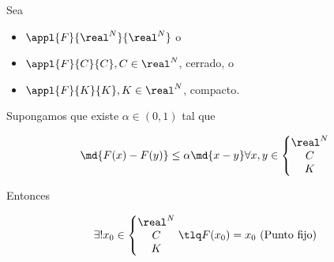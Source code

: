 \begin{theorem} Sea 
\begin{itemize}
\item $\appl{F}{\real^N}{\real^N}$ o
\item $\appl{F}{C}{C}, C\in \real^N$, cerrado, o
\item $\appl{F}{K}{K}, K\in \real^N$, compacto.
\end{itemize}

Supongamos que existe $\alpha\in(0,1)$ tal que

\[ \md{F(x)-F(y)}\leq \alpha\md{x-y} \forall x,y \in \left\{\begin{matrix}
                                                           \real^N\\
                                                           C\\
                                                           K
                                                          \end{matrix}\right. 
                                              \]
                                              
  Entonces                                          
                                           
\[  \exists ! x_0 \in\left\{\begin{matrix}         \real^N\\
                                                           C\\
                                                           K
                                                          \end{matrix}\right. 
                                                        \tlq F(x_0) = x_0 \text{ (Punto fijo)} \]
\label{thmAC}
\end{theorem}


